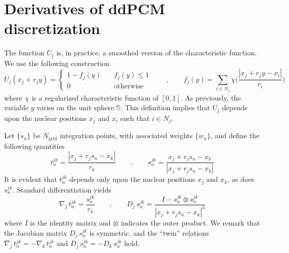 \documentclass[aip,jcp,a4paper,11pt]{revtex4-1}
\newcommand{\nablaj}{\nabla_{\!j}\,}
\newcommand{\Dj}{D_j}
\begin{document}
\section{Derivatives of ddPCM discretization}\label{app:pcm_der}

The function $U_j$ is, in practice, a smoothed version of the characteristic function. We use the following construction
\[
U_j(x_j + r_j y) =
\begin{cases}
1 - f_j(y) 	&\quad f_j(y) \le 1\\
0		&\quad \text{otherwise}
\end{cases}
\qquad , \qquad 
f_j(y) = \sum_{i \in N_j} \chi \bigg(\frac{|x_j + r_j y - x_i|}{r_i}\bigg)
\]
where $\chi$ is a regularized characteristic function of $[0,1]$. As previously, the variable $y$ varies on the unit sphere $\mathbb{S}$. This definition implies that $U_j$ depends upon the nuclear positions $x_j$ and $x_i$ such that $i \in N_j$.



Let $\{ s_n\}$ be $N_\text{grid}$ integration points, with associated weights $\{ w_n \}$, and define the following quantities
\[
t_n^{jk} = \frac{|x_j + r_j s_n -x_k|}{r_k} \qquad , \qquad s_n^{jk} = \frac{x_j + r_j s_n -x_k}{|x_j + r_j s_n -x_k|}%
\]
It is evident that $t_n^{jk}$ depends only upon the nuclear positions $x_j$ and $x_k$, as does $s_n^{jk}$. Standard differentiation yields
\begin{equation}\label{eq:75}
\nablaj t_n^{jk} = \frac{s_n^{jk}}{r_k} \qquad , \qquad \Dj \, s_n^{jk} = \frac{I - s_n^{jk} \otimes s_n^{jk} }{|x_j + r_j s_n - x_k|^3}
\end{equation}
where $I$ is the identity matrix and $\otimes$ indicates the outer product. We remark that the Jacobian matrix $\Dj \, s_n^{jk}$ is symmetric, and the ``twin'' relations $\nabla_{\! j} \, t_n^{jk} = - \nabla_{\! k} \, t_n^{jk}$ and $D_j \, s_n^{jk} = - D_k \, s_n^{jk}$ hold.
\end{document}
